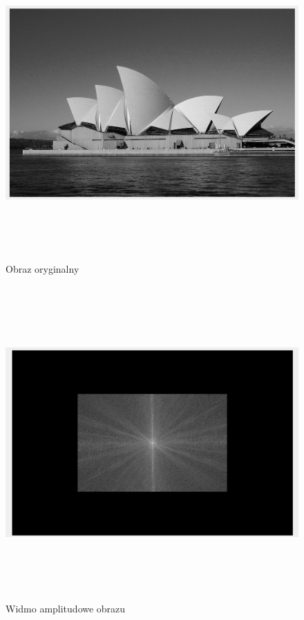\documentclass[a4paper,12pt]{article}
\begin{document}
\begin{justify}
\newpage

\begin{figure}[h!]
\centering
\includegraphics[width=18cm, height=12cm]{sydney}
\caption{Obraz oryginalny}
\end{figure}

\newpage

\begin{figure}[h!]
\centering
\includegraphics[width=18cm, height=12cm]{widmo_ampl}
\caption{Widmo amplitudowe obrazu}
\end{figure}


\end{justify}
\end{document}
